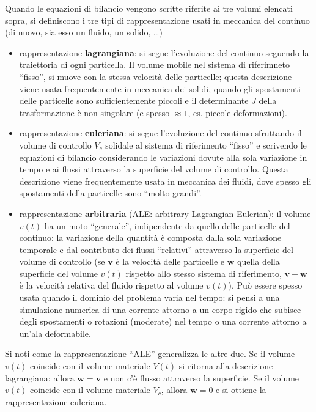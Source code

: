 Quando le equazioni di bilancio vengono scritte riferite ai tre volumi elencati sopra, si definiscono i tre tipi di rappresentazione usati in meccanica
 del continuo (di nuovo, sia esso un fluido, un solido, \dots)

\begin{itemize}
 \item rappresentazione \textbf{lagrangiana}: si segue l'evoluzione del continuo seguendo la traiettoria di ogni particella. Il volume mobile nel sistema
       di riferimneto ``fisso'', si muove con la stessa velocità delle particelle; questa descrizione viene usata frequentemente in meccanica dei solidi,
       quando gli spostamenti delle particelle sono sufficientemente piccoli e il determinante $J$ della trasformazione è non singolare (e spesso $\approx
       1$, es. piccole deformazioni).
 \item rappresentazione \textbf{euleriana}: si segue l'evoluzione del continuo sfruttando il volume di controllo $V_c$ solidale al sistema di 
       riferimento ``fisso'' e scrivendo le equazioni di bilancio considerando le variazioni dovute alla sola variazione in tempo e ai flussi attraverso
       la superficie del volume di controllo. Questa descrizione viene frequentemente usata in meccanica dei fluidi, dove spesso gli spostamenti della
       particelle sono ``molto grandi''. 
 \item rappresentazione \textbf{arbitraria} (ALE: arbitrary Lagrangian Eulerian): il volume $v(t)$ ha un moto ``generale'', indipendente da quello delle 
       particelle del continuo: la variazione della quantità è composta dalla sola variazione temporale e dal contributo dei flussi ``relativi'' 
       attraverso la superficie del volume di controllo (se $\bm{v}$ è la velocità delle particelle e $\bm{w}$ quella della superficie del volume $v(t)$
       rispetto allo stesso sistema di riferimento, $\bm{v} - \bm{w}$ è la velocità relativa del fluido rispetto al volume $v(t)$).
       Può essere spesso usata quando il dominio del problema varia nel tempo: si pensi a una simulazione numerica di una corrente attorno a un corpo
       rigido che subisce degli spostamenti o rotazioni (moderate) nel tempo o una corrente attorno a un'ala deformabile.
\end{itemize}

\noindent
Si noti come la rappresentazione ``ALE'' generalizza le altre due. Se il volume $v(t)$ coincide con il volume materiale $V(t)$ si ritorna alla descrizione
 lagrangiana: allora $\bm{w}=\bm{v}$ e non c'è flusso attraverso la superficie. Se il volume $v(t)$ coincide con il volume materiale $V_c$, allora $\bm{w}
 =0$ e si ottiene la rappresentazione euleriana.
 
